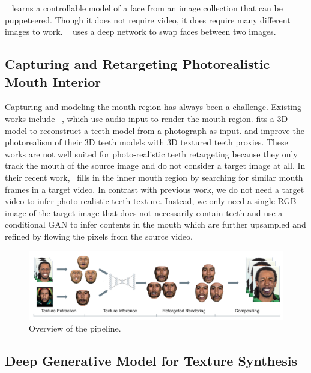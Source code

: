 ~\cite{spacey} learns a controllable model of a face from an image collection that can be puppeteered.  Though it does not require video, it does require many different images to work.  ~\cite{face-swap} uses a deep network to swap faces between two images.

\subsection{Capturing and Retargeting Photorealistic Mouth Interior}
Capturing and modeling the mouth region has always been a challenge. Existing works include ~\cite{Chuang:2005:MSE,Wampler:2007:DES,Taylor:2012:DUV,FanWSX15,edwardsjali}, which use audio input to render the mouth region. \cite{wu2016model} fits a 3D model to reconstruct a teeth model from a photograph as input. 
\cite{garrido2015vdub} and \cite{thies2015real} improve the photorealism of their 3D teeth models with 3D textured teeth proxies.
These works are not well suited for photo-realistic teeth retargeting because they only track the mouth of the source image and do not consider a target image at all.
 In their recent work,~\cite{f2f} fills in the inner mouth region by searching for similar mouth frames in a target video.  
In contrast with previous work, we do not need a target video to infer photo-realistic teeth texture. 
Instead, we only need a single RGB image of the target image that does not necessarily contain teeth and use a conditional GAN to infer contents in the mouth which are further upsampled and refined by flowing the pixels from the source video.   

\begin{figure}[t]
	\centering
	\includegraphics[width=1\linewidth]{figures/overview/pipeline_new2.png}
	\caption{Overview of the pipeline.}\label{fig:arch_content}
	\vspace{-0.15in}
\end{figure}


\subsection{Deep Generative Model for Texture Synthesis}


